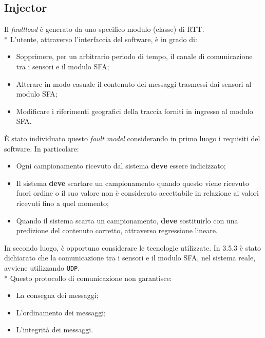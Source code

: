 \subsection{Injector}
Il \emph{faultload} \`e generato da uno specifico modulo (classe) di RTT.\\*
L'utente, attraverso l'interfaccia del software, \`e in grado di:
\begin{itemize}
	\item Sopprimere, per un arbitrario periodo di tempo, il canale di comunicazione tra i sensori e il modulo SFA;
	\item Alterare in modo casuale il contenuto dei messaggi trasmessi dai sensori al modulo SFA;
	\item Modificare i riferimenti geografici della traccia forniti in ingresso al modulo SFA.
\end{itemize}
\`E stato individuato questo \emph{fault model} considerando in primo luogo i requisiti del software. In particolare:
\begin{itemize}
		\item Ogni campionamento ricevuto dal sistema \textbf{deve} essere indicizzato;
		\item Il sistema \textbf{deve} scartare un campionamento quando questo viene ricevuto fuori ordine o il suo valore non \`e considerato accettabile in relazione ai valori ricevuti fino a quel momento;
		\item Quando il sistema scarta un campionamento, \textbf{deve} sostituirlo con una predizione del contenuto corretto, attraverso regressione lineare.
\end{itemize}
In secondo luogo, \`e opportuno considerare le tecnologie utilizzate. In 3.5.3 \`e stato dichiarato che la comunicazione tra i sensori e il modulo SFA, nel sistema reale, avviene utilizzando \texttt{UDP}.\\*
Questo protocollo di comunicazione non garantisce:
	\begin{itemize}
		\item La consegna dei messaggi;
		\item L'ordinamento dei messaggi;
		\item L'integrit\`a dei messaggi.
	\end{itemize}
